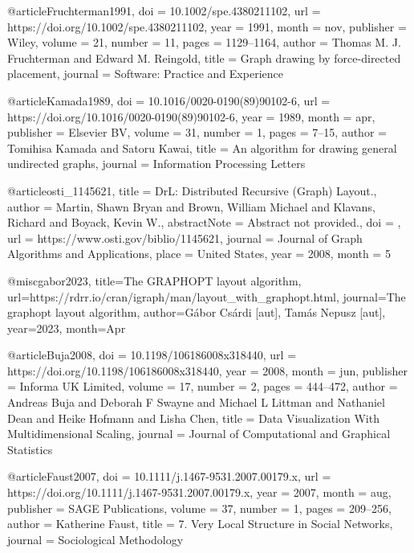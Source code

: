 


@article{Fruchterman1991,
  doi = {10.1002/spe.4380211102},
  url = {https://doi.org/10.1002/spe.4380211102},
  year = {1991},
  month = nov,
  publisher = {Wiley},
  volume = {21},
  number = {11},
  pages = {1129--1164},
  author = {Thomas M. J. Fruchterman and Edward M. Reingold},
  title = {Graph drawing by force-directed placement},
  journal = {Software: Practice and Experience}
}

@article{Kamada1989,
  doi = {10.1016/0020-0190(89)90102-6},
  url = {https://doi.org/10.1016/0020-0190(89)90102-6},
  year = {1989},
  month = apr,
  publisher = {Elsevier {BV}},
  volume = {31},
  number = {1},
  pages = {7--15},
  author = {Tomihisa Kamada and Satoru Kawai},
  title = {An algorithm for drawing general undirected graphs},
  journal = {Information Processing Letters}
}

@article{osti_1145621,
title = {DrL: Distributed Recursive (Graph) Layout.},
author = {Martin, Shawn Bryan and Brown, William Michael and Klavans, Richard and Boyack, Kevin W.},
abstractNote = {Abstract not provided.},
doi = {},
url = {https://www.osti.gov/biblio/1145621}, journal = {Journal of Graph Algorithms and Applications},
place = {United States},
year = {2008},
month = {5}
}

@misc{gabor2023,
  title={The GRAPHOPT layout algorithm},
  url={https://rdrr.io/cran/igraph/man/layout_with_graphopt.html},
  journal={The graphopt layout algorithm},
  author={Gábor Csárdi [aut], Tamás Nepusz [aut]},
  year={2023},
  month={Apr}
} 

@article{Buja2008,
  doi = {10.1198/106186008x318440},
  url = {https://doi.org/10.1198/106186008x318440},
  year = {2008},
  month = jun,
  publisher = {Informa {UK} Limited},
  volume = {17},
  number = {2},
  pages = {444--472},
  author = {Andreas Buja and Deborah F Swayne and Michael L Littman and Nathaniel Dean and Heike Hofmann and Lisha Chen},
  title = {Data Visualization With Multidimensional Scaling},
  journal = {Journal of Computational and Graphical Statistics}
}

@article{Faust2007,
  doi = {10.1111/j.1467-9531.2007.00179.x},
  url = {https://doi.org/10.1111/j.1467-9531.2007.00179.x},
  year = {2007},
  month = aug,
  publisher = {{SAGE} Publications},
  volume = {37},
  number = {1},
  pages = {209--256},
  author = {Katherine Faust},
  title = {7. Very Local Structure in Social Networks},
  journal = {Sociological Methodology}
}

